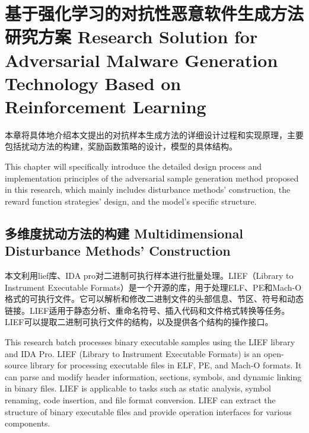 \chapter{基于强化学习的对抗性恶意软件生成方法研究方案 Research Solution for Adversarial Malware Generation Technology Based on Reinforcement Learning}

本章将具体地介绍本文提出的对抗样本生成方法的详细设计过程和实现原理，主要包括扰动方法的构建，奖励函数策略的设计，模型的具体结构。

This chapter will specifically introduce the detailed design process and implementation principles of the adversarial sample generation method proposed in this research, which mainly includes disturbance methods' construction, the reward function strategies' design, and the model's specific structure.

\section{多维度扰动方法的构建 Multidimensional Disturbance Methods' Construction}

本文利用lief库、IDA pro对二进制可执行样本进行批量处理。LIEF（Library to Instrument Executable Formats）是一个开源的库，用于处理ELF、PE和Mach-O格式的可执行文件。它可以解析和修改二进制文件的头部信息、节区、符号和动态链接。LIEF适用于静态分析、重命名符号、插入代码和文件格式转换等任务。LIEF可以提取二进制可执行文件的结构，以及提供各个结构的操作接口。

This research batch processes binary executable samples using the LIEF library and IDA Pro. LIEF (Library to Instrument Executable Formats) is an open-source library for processing executable files in ELF, PE, and Mach-O formats. It can parse and modify header information, sections, symbols, and dynamic linking in binary files. LIEF is applicable to tasks such as static analysis, symbol renaming, code insertion, and file format conversion. LIEF can extract the structure of binary executable files and provide operation interfaces for various components.



